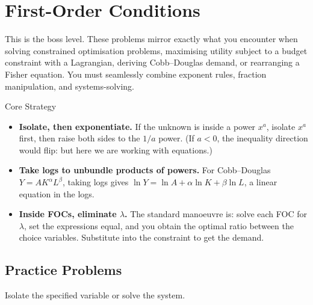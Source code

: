 \chapter{First-Order Conditions}

This is the boss level. These problems mirror exactly what you encounter
when solving constrained optimisation problems, maximising utility
subject to a budget constraint with a Lagrangian, deriving Cobb--Douglas
demand, or rearranging a Fisher equation. You must seamlessly combine
exponent rules, fraction manipulation, and systems-solving.

\begin{rulebox}{Core Strategy}
\begin{itemize}[leftmargin=1.6em,itemsep=0.3ex]
  \item \textbf{Isolate, then exponentiate.} If the unknown is inside a
        power $x^a$, isolate $x^a$ first, then raise both sides to the
        $1/a$ power. \;(If $a < 0$, the inequality direction would flip:
        but here we are working with equations.)
  \item \textbf{Take logs to unbundle products of powers.} For
        Cobb--Douglas $Y = A K^\alpha L^\beta$, taking logs gives
        $\ln Y = \ln A + \alpha \ln K + \beta \ln L$, a linear equation
        in the logs.
  \item \textbf{Inside FOCs, eliminate $\lambda$.} The standard
        manoeuvre is: solve each FOC for $\lambda$, set the expressions
        equal, and you obtain the optimal ratio between the choice
        variables. Substitute into the constraint to get the demand.
\end{itemize}
\end{rulebox}

\section{Practice Problems}

Isolate the specified variable or solve the system.

